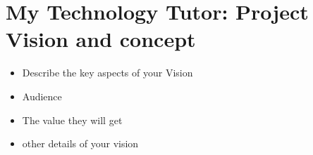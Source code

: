 \section{My Technology Tutor: Project Vision and concept}

\begin{itemize}
    \item Describe the key aspects of your Vision
    \item Audience
    \item The value they will get
    \item other details of your vision
\end{itemize}